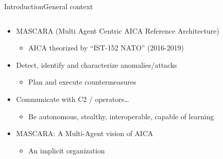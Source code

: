 \begin{frame}{Introduction}{General context}

    \begin{columns}

        \begin{column}{0.5\textwidth}

            \begin{itemize}
                \item MASCARA (Multi Agent Centric AICA Reference Architecture)
                      \begin{itemize}
                          \item AICA theorized by “IST-152 NATO” (2016-2019)
                      \end{itemize}

                \item Detect, identify and characterize anomalies/attacks

                      \begin{itemize}
                          \item Plan and execute countermeasures
                      \end{itemize}

                \item Communicate with C2 / operators…

                      \begin{itemize}
                          \item Be autonomous, stealthy, interoperable, capable of learning
                      \end{itemize}

                \item MASCARA: A Multi-Agent vision of AICA
                      \begin{itemize}
                          \item An implicit organization
                      \end{itemize}
            \end{itemize}

        \end{column}


\end{columns}
\end{frame}
